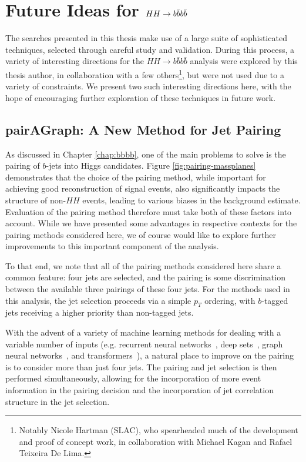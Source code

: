 \chapter{Future Ideas for $HH\rightarrow b\bar{b}b\bar{b}$}
\label{chap:future}

The searches presented in this thesis make use of a large suite of sophisticated techniques, selected 
through careful study and validation. During this process, a variety of interesting 
directions for the $HH\rightarrow b\bar{b}b\bar{b}$ analysis were explored by this thesis author, 
in collaboration with a few others\footnote{Notably Nicole Hartman (SLAC), who spearheaded much of the 
development and proof of concept work, in collaboration with Michael Kagan and Rafael Teixeira De Lima.}, 
but were not used due to a variety of constraints. We present two such interesting directions here, 
with the hope of encouraging further exploration of these techniques in future work.

\section{pairAGraph: A New Method for Jet Pairing}
As discussed in Chapter \ref{chap:bbbb}, one of the main problems to solve is the pairing of 
$b$-jets into Higgs candidates. Figure \ref{fig:pairing-massplanes} demonstrates that the choice 
of the pairing method, while important for achieving good reconstruction of signal events, also 
significantly impacts the structure of non-$HH$ events, leading to various biases in the 
background estimate. Evaluation of the pairing method therefore must take both of these factors 
into account. While we have presented some advantages in respective contexts for the pairing 
methods considered here, we of course would like to explore further improvements to this important 
component of the analysis.

To that end, we note that all of the pairing methods considered here share a common feature: 
four jets are selected, and the pairing is some discrimination between the available three pairings 
of these four jets. For the methods used in this analysis, the jet selection proceeds via a 
simple $p_{T}$ ordering, with $b$-tagged jets receiving a higher priority than non-tagged jets.

With the advent of a variety of machine learning methods for dealing with a variable number of 
inputs (e.g. recurrent neural networks~\cite{RNNs}, deep sets~\cite{DeepSets}, graph neural networks~\cite{GNNs}, 
and transformers~\cite{Transformers}), a natural place to improve on the 
pairing is to consider more than just four jets. The pairing and jet selection is then performed 
simultaneously, allowing for the incorporation of more event information in the pairing decision and 
the incorporation of jet correlation structure in the jet selection.

